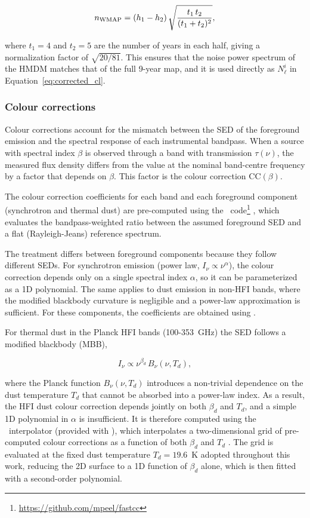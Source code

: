 \begin{equation}
    n_{\rm WMAP} = (h_1 - h_2)\,\sqrt{\frac{t_1\,t_2}{(t_1 + t_2)^2}},
\end{equation}

where $t_1 = 4$ and $t_2 = 5$ are the number of years in each half, giving a normalization factor of $\sqrt{20/81}$. This ensures that the noise power spectrum of the HMDM matches that of the full 9-year map, and it is used directly as $N_\ell^i$ in Equation~\ref{eq:corrected_cl}.

\subsubsection{Colour corrections}
\label{sec:colour_corrections}

Colour corrections account for the mismatch between the SED of the foreground emission and the spectral response of each instrumental bandpass. When a source with spectral index $\beta$ is observed through a band with transmission $\tau(\nu)$, the measured flux density differs from the value at the nominal band-centre frequency by a factor that depends on $\beta$. This factor is the colour correction $\mathrm{CC}(\beta)$.

The colour correction coefficients for each band and each foreground component (synchrotron and thermal dust) are pre-computed using the \fastcc\ code\footnote{\url{https://github.com/mpeel/fastcc}} \citep{Fastcc}, which evaluates the bandpass-weighted ratio between the assumed foreground SED and a flat (Rayleigh-Jeans) reference spectrum.

The treatment differs between foreground components because they follow different SEDs. For synchrotron emission (power law, $I_\nu \propto \nu^\alpha$), the colour correction depends only on a single spectral index $\alpha$, so it can be parameterized as a 1D polynomial. The same applies to dust emission in non-HFI bands, where the modified blackbody curvature is negligible and a power-law approximation is sufficient. For these components, the coefficients are obtained using \fastcc. 

For thermal dust in the Planck HFI bands (100-353~GHz) the SED follows a modified blackbody (MBB),

\begin{equation}
    I_\nu \propto \nu^{\beta_d}\,B_\nu(\nu, T_d),
\end{equation}


where the Planck function $B_\nu(\nu, T_d)$ introduces a non-trivial dependence on the dust temperature $T_d$ that cannot be absorbed into a power-law index. As a result, the HFI dust colour correction depends jointly on both $\beta_d$ and $T_d$, and a simple 1D polynomial in $\alpha$ is insufficient. It is therefore computed using the \interpcc\ interpolator (provided with \fastcc), which interpolates a two-dimensional grid of pre-computed colour corrections as a function of both $\beta_d$ and $T_d$ \citep{Fastcc}. The grid is evaluated at the fixed dust temperature $T_d = 19.6$~K adopted throughout this work, reducing the 2D surface to a 1D function of $\beta_d$ alone, which is then fitted with a second-order polynomial.

